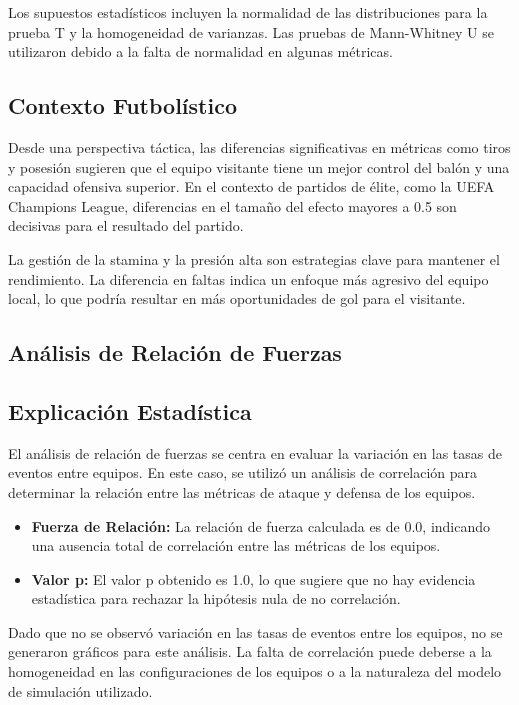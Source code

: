 \documentclass{article}
\begin{document}
        Los supuestos estadísticos incluyen la normalidad de las distribuciones para la prueba T y la homogeneidad de varianzas. Las pruebas de Mann-Whitney U se utilizaron debido a la falta de normalidad en algunas métricas.
        
        \subsection*{Contexto Futbolístico}
        Desde una perspectiva táctica, las diferencias significativas en métricas como tiros y posesión sugieren que el equipo visitante tiene un mejor control del balón y una capacidad ofensiva superior. En el contexto de partidos de élite, como la UEFA Champions League, diferencias en el tamaño del efecto mayores a 0.5 son decisivas para el resultado del partido.
        
        La gestión de la stamina y la presión alta son estrategias clave para mantener el rendimiento. La diferencia en faltas indica un enfoque más agresivo del equipo local, lo que podría resultar en más oportunidades de gol para el visitante.
        
        \subsection{Análisis de Relación de Fuerzas}
        \subsection*{Explicación Estadística}
        El análisis de relación de fuerzas se centra en evaluar la variación en las tasas de eventos entre equipos. En este caso, se utilizó un análisis de correlación para determinar la relación entre las métricas de ataque y defensa de los equipos.
        
        \begin{itemize}
            \item \textbf{Fuerza de Relación:} La relación de fuerza calculada es de 0.0, indicando una ausencia total de correlación entre las métricas de los equipos.
            \item \textbf{Valor p:} El valor p obtenido es 1.0, lo que sugiere que no hay evidencia estadística para rechazar la hipótesis nula de no correlación.
        \end{itemize}
        
        Dado que no se observó variación en las tasas de eventos entre los equipos, no se generaron gráficos para este análisis. La falta de correlación puede deberse a la homogeneidad en las configuraciones de los equipos o a la naturaleza del modelo de simulación utilizado.
        
\end{document}
